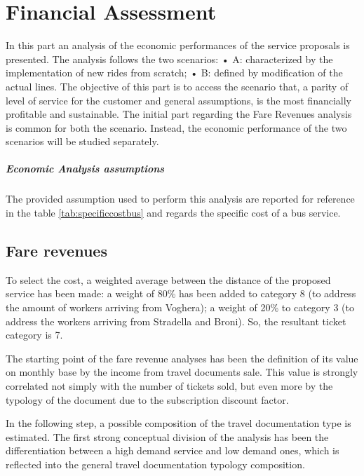 \chapter{Financial Assessment}
In this part an analysis of the economic performances of the service proposals is presented. The analysis follows the two scenarios:
•	A: characterized by the implementation of new rides from scratch;
•	B: defined by modification of the actual lines.
The objective of this part is to access the scenario that, a parity of level of service for the customer and general assumptions, is the most financially profitable and sustainable.
The initial part regarding the Fare Revenues analysis is common for both the scenario. Instead, the economic performance of the two scenarios will be studied separately.


\paragraph{Economic Analysis assumptions}
The provided assumption used to perform this analysis are reported for reference in the table \ref{tab:specificcostbus} and regards the specific cost of a bus service. 



\section{Fare revenues}
To select the cost, a weighted average between the distance of the proposed service has been made: a weight of 80\% has been added to category 8 (to address the amount of workers arriving from Voghera); a weight of 20\% to category 3 (to address the workers arriving from Stradella and Broni). So, the resultant ticket category is 7.

The starting point of the fare revenue analyses has been the definition of its value on monthly base by the income from travel documents sale. This value is strongly correlated not simply with the number of tickets sold, but even more by the typology of the document due to the subscription discount factor.

In the following step, a possible composition of the travel documentation type is estimated. The first strong conceptual division of the analysis has been the differentiation between a high demand service and low demand ones, which is reflected into the general travel documentation typology composition.

